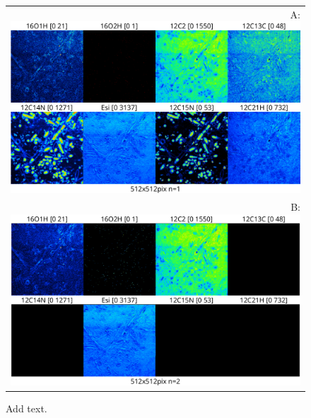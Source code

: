 \begin{figure}[!ht]
\centering
\begin{tabular}{r}
A: \includegraphics[scale=0.6, valign=t]{figs8/m-001}
\\
B: \includegraphics[scale=0.6, valign=t]{figs8/m-002}
\end{tabular}
\caption{\label{fig:LANS-8plus-frames}%
Add text.}
\end{figure}

